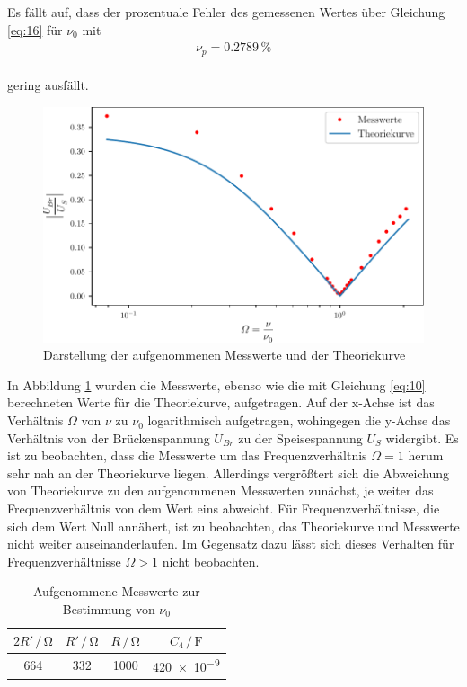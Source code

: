 \noindent
Es fällt auf, dass der prozentuale Fehler des gemessenen Wertes über Gleichung \ref{eq:16} für $\nu_{0}$ mit 
\begin{align}
\nu_p = 0.2789\, \% \nonumber
\end{align}
\\
gering ausfällt.
\begin{figure}[H]
  \centering
  \includegraphics{plot.pdf}
   \caption{Darstellung der aufgenommenen Messwerte und der Theoriekurve}
   \label{fig:plot}
\end{figure}
\noindent In Abbildung \ref{fig:plot} wurden die Messwerte, ebenso wie die mit Gleichung \ref{eq:10}
berechneten Werte für die Theoriekurve, aufgetragen. Auf der x-Achse ist das Verhältnis $\Omega$ von $\nu$ zu $\nu_{0}$
logarithmisch aufgetragen, wohingegen die y-Achse das Verhältnis von der Brückenspannung $U_{Br}$ zu der Speisespannung
$U_{S}$ widergibt.
Es ist zu beobachten, dass die Messwerte um das Frequenzverhältnis $\Omega = 1$
herum sehr nah an der Theoriekurve liegen. Allerdings vergrößtert sich die Abweichung von Theoriekurve zu den aufgenommenen
Messwerten zunächst, je weiter das Frequenzverhältnis von dem Wert eins abweicht. Für Frequenzverhältnisse, die sich dem Wert Null
annähert, ist zu beobachten, das Theoriekurve und Messwerte nicht weiter auseinanderlaufen. Im Gegensatz dazu lässt sich 
dieses Verhalten für Frequenzverhältnisse $\Omega > 1$ nicht beobachten.





\begin{table}[h]
\normalsize
\centering
{}
\begin{tabular}{c c c c}
\toprule
        $2R' \,/\,\si{\ohm}$ & $R' \,/\,\si{\ohm}$ & $R \,/\,\si{\ohm}$ & $C_{4} \,/\, \si{\farad}$ \\
        \midrule
        664 & 332 & 1000 & \num{420e-9} \\
\bottomrule
\end{tabular}
\caption{Aufgenommene Messwerte zur Bestimmung von $\nu_{0}$} 
\label{tab:6}
\end{table}


